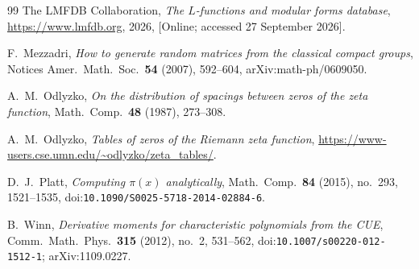\documentclass[12pt]{amsart}
\theoremstyle{remark}
\newcommand{\1}{\mathbf{1}}
\begin{document}
\begin{thebibliography}{99}
 The LMFDB Collaboration, \emph{The $L$-functions and modular
forms database}, \url{https://www.lmfdb.org}, 2026, [Online; accessed
27 September 2026].

 F.~Mezzadri, \emph{How to generate random matrices from the
classical compact groups}, Notices Amer.\ Math.\ Soc.\ \textbf{54} (2007),
592--604, arXiv:math-ph/0609050.

 A.~M.~Odlyzko, \emph{On the distribution of spacings
between zeros of the zeta function}, Math.\ Comp.\ \textbf{48} (1987),
273--308.

 A.~M.~Odlyzko, \emph{Tables of zeros of the Riemann
zeta function}, \url{https://www-users.cse.umn.edu/~odlyzko/zeta_tables/}.

 D.~J.~Platt, \emph{Computing $\pi(x)$ analytically},
Math.\ Comp.\ \textbf{84} (2015), no.~293, 1521--1535,
doi:\nolinkurl{10.1090/S0025-5718-2014-02884-6}.

 B.~Winn, \emph{Derivative moments for characteristic
polynomials from the CUE}, Comm.\ Math.\ Phys.\ \textbf{315} (2012),
no.~2, 531--562, doi:\nolinkurl{10.1007/s00220-012-1512-1}; arXiv:1109.0227.

\end{thebibliography}
\end{document}

